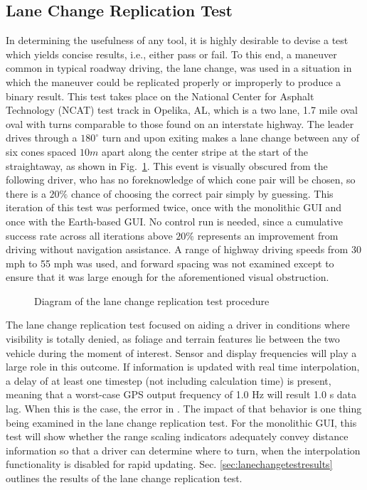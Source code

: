\subsection{Lane Change Replication Test} \label{sec:lanechangetest}
In determining the usefulness of any tool, it is highly desirable to devise a test which yields concise results, i.e., either pass or fail. To this end, a maneuver common in typical roadway driving, the lane change, was used in a situation in which the maneuver could be replicated properly or improperly to produce a binary result. This test takes place on the National Center for Asphalt Technology (NCAT) test track in Opelika, AL, which is a two lane, 1.7 mile oval oval with turns comparable to those found on an interstate highway. The leader drives through a $180^\circ$ turn and upon exiting makes a lane change between any of six cones spaced $10m$ apart along the center stripe at the start of the straightaway, as shown in Fig.~\ref{fig:lanechangediagram}. This event is visually obscured from the following driver, who has no foreknowledge of which cone pair will be chosen, so there is a $20\%$ chance of choosing the correct pair simply by guessing. This iteration of this test was performed twice, once with the monolithic GUI and once with the Earth-based GUI. No control run is needed, since a cumulative success rate across all iterations above $20\%$ represents an improvement from driving without navigation assistance. A range of highway driving speeds from 30 mph to 55 mph was used, and forward spacing was not examined except to ensure that it was large enough for the aforementioned visual obstruction.

\begin{figure}[ht] \centering
    
    \caption{Diagram of the lane change replication test procedure} \label{fig:lanechangediagram}
\end{figure}

The lane change replication test focused on aiding a driver in conditions where visibility is totally denied, as foliage and terrain features lie between the two vehicle during the moment of interest. Sensor and display frequencies will play a large role in this outcome. If information is updated with real time interpolation, a delay of at least one timestep (not including calculation time) is present, meaning that a worst-case GPS output frequency of 1.0 Hz will result 1.0 s data lag. When this is the case, the error in . The impact of that behavior is one thing being examined in the lane change replication test. For the monolithic GUI, this test will show whether the range scaling indicators adequately convey distance information so that a driver can determine where to turn, when the interpolation functionality is disabled for rapid updating. Sec. \ref{sec:lanechangetestresults} outlines the results of the lane change replication test.

